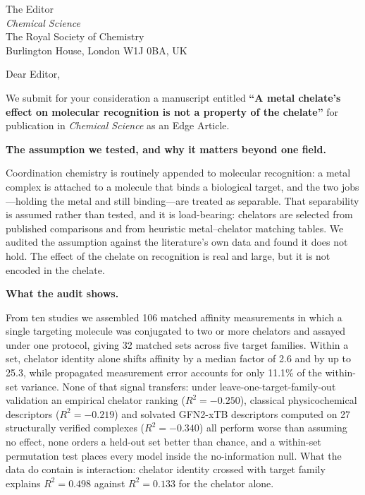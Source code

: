 \documentclass[11pt]{letter}
\providecommand{\paragraph}{}
\renewcommand{\paragraph}[1]{\par\medskip\noindent\textbf{#1}\par\nobreak\smallskip}
\begin{document}
\begin{letter}{The Editor \\
\textit{Chemical Science} \\
The Royal Society of Chemistry \\
Burlington House, London W1J 0BA, UK}

\opening{Dear Editor,}

We submit for your consideration a manuscript entitled
\textbf{``A metal chelate's effect on molecular recognition is not a property of
the chelate''} for publication in \textit{Chemical Science} as an Edge Article.

\paragraph{The assumption we tested, and why it matters beyond one field.}
Coordination chemistry is routinely appended to molecular recognition: a metal
complex is attached to a molecule that binds a biological target, and the two
jobs---holding the metal and still binding---are treated as separable. That
separability is assumed rather than tested, and it is load-bearing: chelators
are selected from published comparisons and from heuristic metal--chelator
matching tables. We audited the assumption against the literature's own data and
found it does not hold. The effect of the chelate on recognition is real and
large, but it is not encoded in the chelate.

\paragraph{What the audit shows.}
From ten studies we assembled 106 matched affinity measurements in which a
single targeting molecule was conjugated to two or more chelators and assayed
under one protocol, giving 32 matched sets across five target families. Within a
set, chelator identity alone shifts affinity by a median factor of 2.6 and by up
to 25.3, while propagated measurement error accounts for only 11.1\% of the
within-set variance. None of that signal transfers: under
leave-one-target-family-out validation an empirical chelator ranking
($R^2 = -0.250$), classical physicochemical descriptors ($R^2 = -0.219$) and
solvated GFN2-xTB descriptors computed on 27 structurally verified complexes
($R^2 = -0.340$) all perform worse than assuming no effect, none orders a
held-out set better than chance, and a within-set permutation test places every
model inside the no-information null. What the data do contain is interaction:
chelator identity crossed with target family explains $R^2 = 0.498$ against
$R^2 = 0.133$ for the chelator alone.


\end{letter}
\end{document}
